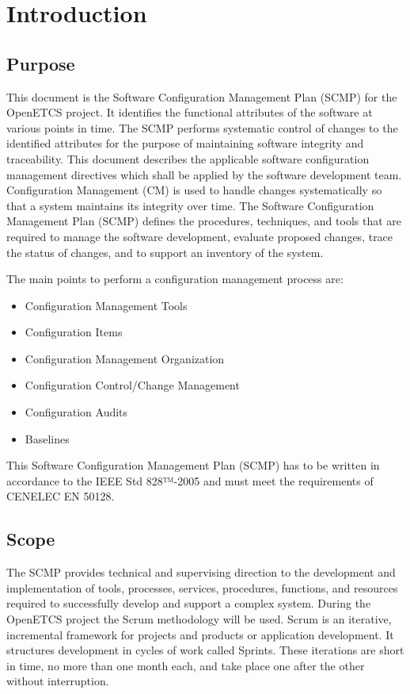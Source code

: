 \documentclass{template/openetcs_article}
\begin{document}
\section[Introduction]{Introduction}


\subsection{Purpose}


This document is the Software Configuration Management Plan (SCMP) for the OpenETCS project. It identifies the functional attributes of the software at various points in time. The SCMP performs systematic control of changes to the identified attributes for the purpose of maintaining software integrity and traceability. This document describes the applicable software configuration management directives which shall be applied by the software development team. Configuration Management (CM) is used to handle changes systematically so that a system maintains its integrity over time. The Software Configuration Management Plan (SCMP) defines the procedures, techniques, and tools that are required to manage the software development, evaluate proposed changes, trace the status of changes, and to support an inventory of the system. 

The main points to perform a configuration management process are:

\vspace{-10pt}
\begin{itemize}
\item Configuration Management Tools
\item Configuration Items
\item Configuration Management Organization
\item Configuration Control/Change Management
\item Configuration Audits
\item Baselines
\end{itemize}


This Software Configuration Management Plan (SCMP) has to be written in accordance to the IEEE Std 828™-2005 and must meet the requirements of CENELEC EN 50128.

\subsection{Scope }
The SCMP provides technical and supervising direction to the development and implementation of tools, processes, services,  procedures, functions, and resources required to successfully develop and support a complex system.
During the OpenETCS project the Scrum methodology will be used. Scrum is an iterative, incremental framework for projects  and products or application development. It structures development in cycles of work called Sprints. These iterations are short  in time, no more than one month each, and take place one after the other without interruption.
\end{document}
